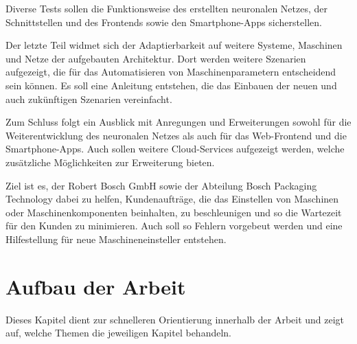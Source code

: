 Diverse Tests sollen die Funktionsweise des erstellten neuronalen Netzes, der Schnittstellen und des Frontends
sowie den Smartphone-Apps sicherstellen.

Der letzte Teil widmet sich der Adaptierbarkeit auf weitere Systeme, Maschinen und Netze der aufgebauten Architektur.
Dort werden weitere Szenarien aufgezeigt, die für das Automatisieren von Maschinenparametern entscheidend sein können.
Es soll eine Anleitung entstehen, die das Einbauen der neuen und auch zukünftigen Szenarien vereinfacht.

Zum Schluss folgt ein Ausblick mit Anregungen und Erweiterungen sowohl für die Weiterentwicklung des neuronalen Netzes
als auch für das Web-Frontend und die Smartphone-Apps. Auch sollen weitere Cloud-Services aufgezeigt werden, welche
zusätzliche Möglichkeiten zur Erweiterung bieten.

Ziel ist es, der Robert Bosch GmbH sowie der Abteilung Bosch Packaging Technology dabei zu helfen, Kundenaufträge, die
das Einstellen von Maschinen oder Maschinenkomponenten beinhalten, zu beschleunigen und so die Wartezeit für den Kunden
zu minimieren. Auch soll so Fehlern vorgebeut werden und eine Hilfestellung für neue Maschineneinsteller entstehen.

\newpage

\section{Aufbau der Arbeit}
\label{sec:aufbauDerArbeit}
Dieses Kapitel dient zur schnelleren Orientierung innerhalb der Arbeit und zeigt auf, welche Themen die jeweiligen
Kapitel behandeln.

